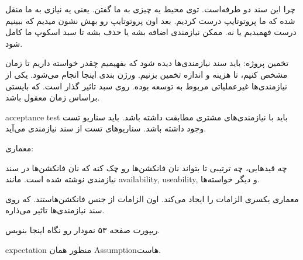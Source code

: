 چرا این سند دو طرفه‌است. توی محیط یه چیزی به ما گفتن. یعنی یه نیازی به ما منقل
شده که ما پروتوتایپ درست کردیم. بعد اون پروتوتایپ رو بهش نشون میدیم که ببینیم
درست فهمیدیم یا نه. ممکن نیازمندی اضافه بشه یا حذف بشه تا سبد اسکوپ ما کامل شود.

تخمین پروژه: باید سند نیازمندی‌ها دیده شود که بفهیمیم چقدر خواسته داریم تا زمان
مشخص کنیم، تا هزینه و اندازه تخمین بزنیم. ورژن بندی اینجا انجام می‌شود. یکی از
نیازمندی‌ها غیرعملیاتی مربوط به توسعه بوده. روی سبد تاثیر گذار است. که بایستی
براساس زمان معقول باشد.

acceptance test باید با نیازمندی‌های مشتری مطابقت داشته باشد. باید سناریو تست
وجود داشته باشد. سناریو‌های تست از سند نیازمندی می‌آید.

معماری:

چه قید‌هایی، چه ترتیبی تا بتواند نان فانکشن‌ها رو چک کنه که نان فانکشن‌ها در سند
نیازمندی نوشته شده است. مانند availability, useability, و دیگر خواسته‌ها.

معماری یکسری الزامات را ایجاد می‌کند. اون الزامات از جنس فانکشن‌هاستند. که روی
سند نیازمندی‌ها تاثیر می‌ذاره.

ریپورت صفحه ۵۳ نمودار رو نگاه اینجا بنویس.

expectation منظور همان Assumptionهاست.
